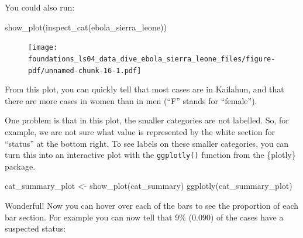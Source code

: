 \documentclass[
  letterpaper,
  DIV=11,
  numbers=noendperiod]{scrreprt}
\newenvironment{Shaded}{\begin{snugshade}}{\end{snugshade}}
\newcommand{\FunctionTok}[1]{\textcolor[rgb]{0.28,0.35,0.67}{#1}}
\newcommand{\NormalTok}[1]{\textcolor[rgb]{0.00,0.23,0.31}{#1}}
\newcommand{\OtherTok}[1]{\textcolor[rgb]{0.00,0.23,0.31}{#1}}
\begin{document}
\begin{tcolorbox}[enhanced jigsaw, colframe=quarto-callout-note-color-frame, rightrule=.15mm, opacityback=0, breakable, coltitle=black, colbacktitle=quarto-callout-note-color!10!white, bottomrule=.15mm, leftrule=.75mm, toprule=.15mm, arc=.35mm, bottomtitle=1mm, colback=white, left=2mm, opacitybacktitle=0.6, titlerule=0mm, title=\textcolor{quarto-callout-note-color}{\faInfo}\hspace{0.5em}{Side Note}, toptitle=1mm]

You could also run:

\begin{Shaded}
\begin{Highlighting}[]
\FunctionTok{show\_plot}\NormalTok{(}\FunctionTok{inspect\_cat}\NormalTok{(ebola\_sierra\_leone))}
\end{Highlighting}
\end{Shaded}

\begin{figure}[H]

{\centering \texttt{[image: foundations\_ls04\_data\_dive\_ebola\_sierra\_leone\_files/figure-pdf/unnamed-chunk-16-1.pdf]}

}

\end{figure}

\end{tcolorbox}

From this plot, you can quickly tell that most cases are in Kailahun,
and that there are more cases in women than in men (``F'' stands for
``female'').

One problem is that in this plot, the smaller categories are not
labelled. So, for example, we are not sure what value is represented by
the white section for ``status'' at the bottom right. To see labels on
these smaller categories, you can turn this into an interactive plot
with the \texttt{ggplotly()} function from the \{plotly\} package.

\begin{Shaded}
\begin{Highlighting}[]
\NormalTok{cat\_summary\_plot }\OtherTok{\textless{}{-}} \FunctionTok{show\_plot}\NormalTok{(cat\_summary)}
\FunctionTok{ggplotly}\NormalTok{(cat\_summary\_plot)}
\end{Highlighting}
\end{Shaded}

Wonderful! Now you can hover over each of the bars to see the proportion
of each bar section. For example you can now tell that 9\% (0.090) of
the cases have a suspected status:
\end{document}
